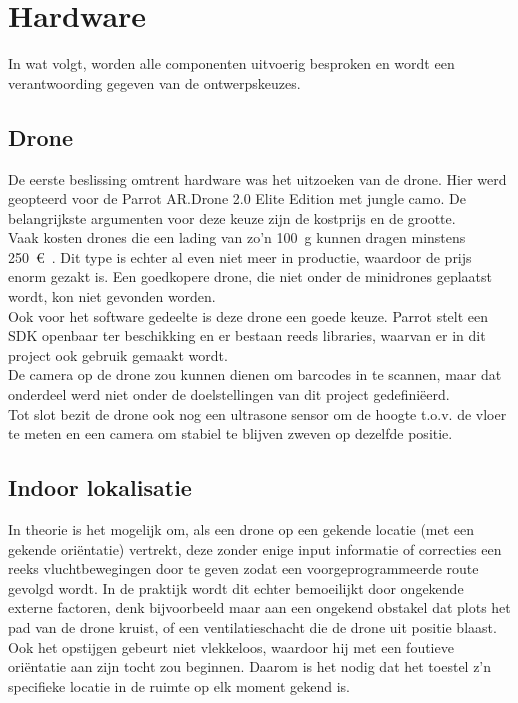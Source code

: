 \chapter{Hardware}
In wat volgt, worden alle componenten uitvoerig besproken en wordt een verantwoording gegeven van de ontwerpskeuzes.

\section{Drone} \label{sec:drone}
De eerste beslissing omtrent hardware was het uitzoeken van de drone. Hier werd geopteerd voor de Parrot AR.Drone 2.0 Elite Edition met jungle camo. De belangrijkste argumenten voor deze keuze zijn de kostprijs en de grootte.\\

Vaak kosten drones die een lading van zo'n \SI{100}{\g} kunnen dragen minstens \SI{250}{\euro{}}. Dit type is echter al even niet meer in productie, waardoor de prijs enorm gezakt is. Een goedkopere drone, die niet onder de minidrones geplaatst wordt, kon niet gevonden worden.\\

Ook voor het software gedeelte is deze drone een goede keuze. Parrot stelt een SDK openbaar ter beschikking en er bestaan reeds libraries, waarvan er in dit project ook gebruik gemaakt wordt.\\
De camera op de drone zou kunnen dienen om barcodes in te scannen, maar dat onderdeel werd niet onder de doelstellingen van dit project gedefini\"eerd.\\
Tot slot bezit de drone ook nog een ultrasone sensor om de hoogte t.o.v. de vloer te meten en een camera om stabiel te blijven zweven op dezelfde positie.

\section{Indoor lokalisatie}  \label{sec:uwb}
In theorie is het mogelijk om, als een drone op een gekende locatie (met een gekende ori\"entatie) vertrekt, deze zonder enige input informatie of correcties een reeks vluchtbewegingen door te geven zodat een voorgeprogrammeerde route gevolgd wordt. In de praktijk wordt dit echter bemoeilijkt door ongekende externe factoren, denk bijvoorbeeld maar aan een ongekend obstakel dat plots het pad van de drone kruist, of een ventilatieschacht die de drone uit positie blaast. Ook het opstijgen gebeurt niet vlekkeloos, waardoor hij met een foutieve ori\"entatie aan zijn tocht zou beginnen. Daarom is het nodig dat het toestel z'n specifieke locatie in de ruimte op elk moment gekend is. \\

